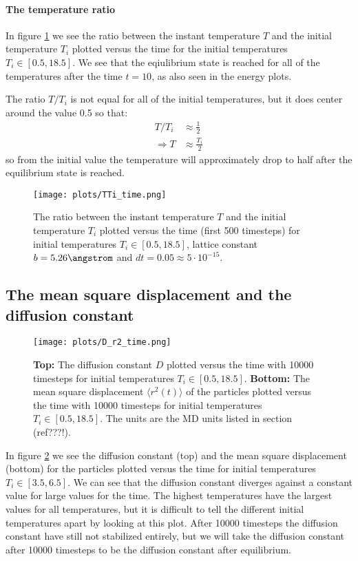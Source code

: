 \documentclass[11pt,a4wide]{article}
\begin{document}
\paragraph{The temperature ratio}

In figure \ref{fig: TTi_time} we see the ratio between the instant temperature $T$ and the initial temperature $T_i$ plotted versus the time for the initial temperatures $T_i \in [0.5, 18.5]$. We see that the eqiulibrium state is reached for all of the temperatures after the time $t=10$, as also seen in the energy plots. 

The ratio $T/T_i$ is not equal for all of the initial temperatures, but it does center around the value 0.5 so that:
\begin{align*}
T/T_i &\approx \frac{1}{2} \\
\Rightarrow T &\approx \frac{T_i }{2} 
\end{align*}
so from the initial value the temperature will approximately drop to half after the equilibrium state is reached. 

\begin{figure}[htp]
\centering
\texttt{[image: plots/TTi\_time.png]}
\caption{The ratio between the instant temperature $T$ and the initial temperature $T_i$ plotted versus the time (first 500 timesteps) for initial temperatures $T_i \in [0.5, 18.5]$, lattice constant $b=5.26 \angstrom$ and $dt=0.05\approx  5\cdot 10^{-15}$.}
\label{fig: TTi_time}
\end{figure}

\subsection{The mean square displacement and the diffusion constant}

\begin{figure}[htp]
\centering
\texttt{[image: plots/D\_r2\_time.png]}
\caption{\textbf{Top:} The diffusion constant $D$ plotted versus the time with 10000 timesteps for initial temperatures $T_i \in [0.5, 18.5]$. \textbf{Bottom:} The mean square displacement $\langle r^2(t) \rangle$ of the particles plotted versus the time with 10000 timesteps for initial temperatures $T_i \in [0.5, 18.5]$. The units are the MD units listed in section (ref???!).}
\label{fig: D_r2_time}
\end{figure}

In figure \ref{fig: D_r2_time} we see the diffusion constant (top) and the mean square displacement (bottom) for the particles plotted versus the time for initial temperatures $T_i \in [3.5, 6.5]$. We can see that the diffusion constant diverges against a constant value for large values for the time. The highest temperatures have the largest values for all temperatures, but it is difficult to tell the different initial temperatures apart by looking at this plot. After 10000 timesteps the diffusion constant have still not stabilized entirely, but we will take the diffusion constant after 10000 timesteps to be the diffusion constant after equilibrium. 
\end{document}
